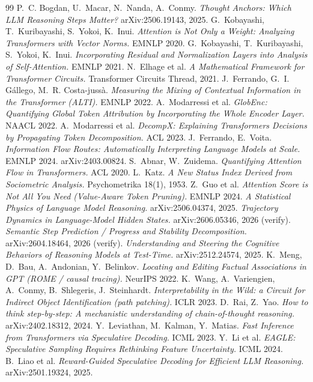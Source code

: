 \documentclass[11pt]{article}
\begin{document}
\begin{thebibliography}{99}
\small
{} P.~C. Bogdan, U.~Macar, N.~Nanda, A.~Conmy.
\emph{Thought Anchors: Which LLM Reasoning Steps Matter?} arXiv:2506.19143, 2025.
 G.~Kobayashi, T.~Kuribayashi, S.~Yokoi, K.~Inui.
\emph{Attention is Not Only a Weight: Analyzing Transformers with Vector Norms.} EMNLP 2020.
 G.~Kobayashi, T.~Kuribayashi, S.~Yokoi, K.~Inui.
\emph{Incorporating Residual and Normalization Layers into Analysis of Self-Attention.} EMNLP 2021.
 N.~Elhage et al.
\emph{A Mathematical Framework for Transformer Circuits.} Transformer Circuits Thread, 2021.
 J.~Ferrando, G.~I. G\'allego, M.~R. Costa-juss\`a.
\emph{Measuring the Mixing of Contextual Information in the Transformer (ALTI).} EMNLP 2022.
 A.~Modarressi et al.
\emph{GlobEnc: Quantifying Global Token Attribution by Incorporating the Whole Encoder Layer.} NAACL 2022.
 A.~Modarressi et al.
\emph{DecompX: Explaining Transformers Decisions by Propagating Token Decomposition.} ACL 2023.
 J.~Ferrando, E.~Voita.
\emph{Information Flow Routes: Automatically Interpreting Language Models at Scale.} EMNLP 2024. arXiv:2403.00824.
 S.~Abnar, W.~Zuidema.
\emph{Quantifying Attention Flow in Transformers.} ACL 2020.
 L.~Katz.
\emph{A New Status Index Derived from Sociometric Analysis.} Psychometrika 18(1), 1953.
 Z.~Guo et al.
\emph{Attention Score is Not All You Need (Value-Aware Token Pruning).} EMNLP 2024.
 \emph{A Statistical Physics of Language Model Reasoning.} arXiv:2506.04374, 2025.
 \emph{Trajectory Dynamics in Language-Model Hidden States.} arXiv:2606.05346, 2026 (verify).
 \emph{Semantic Step Prediction / Progress and Stability Decomposition.} arXiv:2604.18464, 2026 (verify).
 \emph{Understanding and Steering the Cognitive Behaviors of Reasoning Models at Test-Time.} arXiv:2512.24574, 2025.
 K.~Meng, D.~Bau, A.~Andonian, Y.~Belinkov.
\emph{Locating and Editing Factual Associations in GPT (ROME / causal tracing).} NeurIPS 2022.
 K.~Wang, A.~Variengien, A.~Conmy, B.~Shlegeris, J.~Steinhardt.
\emph{Interpretability in the Wild: a Circuit for Indirect Object Identification (path patching).} ICLR 2023.
 D.~Rai, Z.~Yao.
\emph{How to think step-by-step: A mechanistic understanding of chain-of-thought reasoning.} arXiv:2402.18312, 2024.
 Y.~Leviathan, M.~Kalman, Y.~Matias.
\emph{Fast Inference from Transformers via Speculative Decoding.} ICML 2023.
 Y.~Li et al.
\emph{EAGLE: Speculative Sampling Requires Rethinking Feature Uncertainty.} ICML 2024.
 B.~Liao et al.
\emph{Reward-Guided Speculative Decoding for Efficient LLM Reasoning.} arXiv:2501.19324, 2025.
\end{thebibliography}
\end{document}
